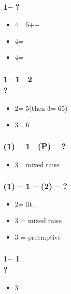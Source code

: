 \documentclass[12pt, a4paper]{article}
\begin{document}
\subsubsection*{1\clubs -- ?}
\begin{itemize}
    \item 4\clubs = 5++\spades
    \item 4\diams = \hearts
    \item 4\hearts = \spades
\end{itemize}

\subsubsection*{1\clubs -- 1\spades -- 2\diams\\
                ?}
\begin{itemize}
    \item 2\spades = 5\spades (then 3\spades = 65)
    \item 3\clubs = 6\spades
\end{itemize}

\subsubsection*{(1\minor) -- 1\hearts -- (P) -- ?}
\begin{itemize}
    \item 3\minor = mixed raise
\end{itemize}

\subsubsection*{(1) -- 1 -- (2) -- ?}
\begin{itemize}
    \item 2\nt = fit, \invp
    \item 3 = mixed raise
    \item 3 = preemptive
\end{itemize}

\subsubsection*{1\diams -- 1\hearts\\
                ?}
\begin{itemize}
    \item 3\clubs = \gf
\end{itemize}
\end{document}
